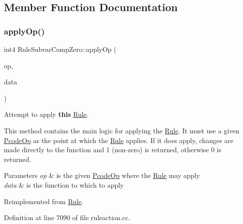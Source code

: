 \subsection{Member Function Documentation}
\mbox{\label{class_rule_subvar_comp_zero_a4875048b2b35720b88c6dd2667c4164b}} 
\subsubsection{\texorpdfstring{applyOp()}{applyOp()}}
{\footnotesize\ttfamily int4 Rule\+Subvar\+Comp\+Zero\+::apply\+Op (\begin{DoxyParamCaption}\item[{\mbox{\hyperlink{class_pcode_op}{Pcode\+Op}} $\ast$}]{op,  }\item[{\mbox{\hyperlink{class_funcdata}{Funcdata}} \&}]{data }\end{DoxyParamCaption})\hspace{0.3cm}{\ttfamily [virtual]}}



Attempt to apply {\bfseries{this}} \mbox{\hyperlink{class_rule}{Rule}}. 

This method contains the main logic for applying the \mbox{\hyperlink{class_rule}{Rule}}. It must use a given \mbox{\hyperlink{class_pcode_op}{Pcode\+Op}} as the point at which the \mbox{\hyperlink{class_rule}{Rule}} applies. If it does apply, changes are made directly to the function and 1 (non-\/zero) is returned, otherwise 0 is returned. 
\begin{DoxyParams}{Parameters}
{\em op} & is the given \mbox{\hyperlink{class_pcode_op}{Pcode\+Op}} where the \mbox{\hyperlink{class_rule}{Rule}} may apply \\
\hline
{\em data} & is the function to which to apply \\
\hline
\end{DoxyParams}


Reimplemented from \mbox{\hyperlink{class_rule_a4e3e61f066670175009f60fb9dc60848}{Rule}}.



Definition at line 7090 of file ruleaction.\+cc.

